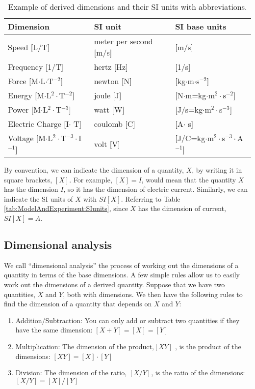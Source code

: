 \begin{table}[!h]
\centering
\begin{tabular}{lll }  
\textbf{Dimension}&\textbf{SI unit}&\textbf{SI base units}\\
\hline
\hline
Speed [L/T]& meter per second [m/s] & [m/s]\\ \hline
Frequency [1/T]& hertz [Hz] & [1/s]\\ \hline
Force [M$\cdot$L$\cdot$T$^{-2}$]& newton [N]&[kg$\cdot$m$\cdot$s$^{-2}$]\\ \hline
Energy [M$\cdot$L$^2\cdot$T$^{-2}$]& joule [J]&[N$\cdot$m=kg$\cdot$m$^2\cdot$s$^{-2}$] \\ \hline
Power [M$\cdot$L$^2\cdot$T$^{-3}$]& watt [W]&[J/s=kg$\cdot$m$^2\cdot$s$^{-3}$]\\ \hline
Electric Charge [I$\cdot$ T]& coulomb [C]&[A$\cdot$ s] \\ \hline
Voltage [M$\cdot$L$^2\cdot$T$^{-3}\cdot$I$^{-1}$]& volt [V]&[J/C=kg$\cdot$m$^2\cdot$s$^{-3}\cdot$A$^{-1}$] \\ \hline
\end{tabular}
\caption{\label{tab:ModelAndExperiment:DerivedSIunits} Example of derived dimensions and their SI units with abbreviations.}
\end{table}

By convention, we can indicate the dimension of a quantity, $X$, by writing it in square brackets, $[X]$. For example, $[X]=I$, would mean that the quantity $X$ has the dimension $I$, so it has the dimension of electric current. Similarly, we can indicate the SI units of $X$ with $SI[X]$. Referring to Table \ref{tab:ModelAndExperiment:SIunits}, since $X$ has the dimension of current, $SI[X]=A$.

\subsection{Dimensional analysis}
We call ``dimensional analysis'' the process of working out the dimensions of a quantity in terms of the base dimensions. A few simple rules allow us to easily work out the dimensions of a derived quantity. Suppose that we have two quantities, $X$ and $Y$, both with dimensions. We then have the following rules to find the dimension of a quantity that depends on $X$ and $Y$:
\begin{enumerate}
\item Addition/Subtraction: You can only add or subtract two quantities if they have the same dimension: $[X+Y]=[X]=[Y]$
\item Multiplication: The dimension of the product,$[XY]$ , is the product of the dimensions: $[XY]=[X]\cdot[Y]$
\item Division: The dimension of the ratio, $[X/Y]$, is the ratio of the dimensions: $[X/Y]=[X]/[Y]$
\end{enumerate}

